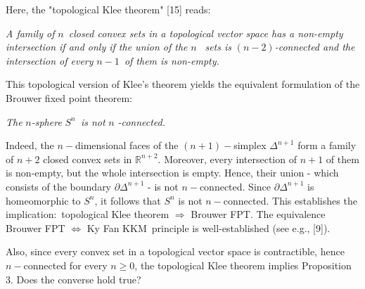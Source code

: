 \documentclass{article}
\begin{document}
Here, the "topological Klee theorem" [15] reads:\bigskip

\textit{A family of }$n$\textit{\ closed convex sets in a topological vector
space has a non-empty intersection if and only if the union of the }$n$%
\textit{\ sets is }$(n-2)$\textit{-connected and the intersection of every }$%
n-1$\textit{\ of them is non-empty.}\bigskip

This topological version of Klee's theorem yields the equivalent formulation
of the Brouwer fixed point theorem:

\begin{center}
\textit{The }$n$\textit{-sphere }$S^{n}$\textit{\ is not }$n$\textit{%
-connected.}
\end{center}

Indeed, the $n-$dimensional faces of the $(n+1)-$simplex $\Delta ^{n+1}$
form a family of $n+2$ closed convex sets in $%
\mathbb{R}
^{n+2}$. Moreover, every intersection of $n+1$ of them is non-empty, but the
whole intersection is empty. Hence, their union - which consists of the
boundary $\partial \Delta ^{n+1}$ - is not $n-$connected. Since $\partial
\Delta ^{n+1}$ is homeomorphic to $S^{n}$, it follows that $S^{n}$ is not $%
n- $connected. This establishes the implication:\ topological Klee theorem $%
\Longrightarrow $ Brouwer FPT. The equivalence Brouwer FPT $%
\Longleftrightarrow $ Ky Fan KKM\ principle is well-established (see e.g.,
[9]).

Also, since every convex set in a topological vector space is contractible,
hence $n-$connected for every $n\geq 0$, the topological Klee theorem
implies Proposition 3. Does the converse hold true?\bigskip
\end{document}
